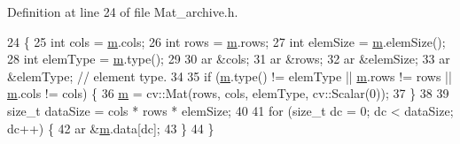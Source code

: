 Definition at line 24 of file Mat\+\_\+archive.\+h.


\begin{DoxyCode}
24                                                                          \{
25   \textcolor{keywordtype}{int} cols = \hyperlink{_gen_blob_8m_ab3cd915d758008bd19d0f2428fbb354a}{m}.cols;
26   \textcolor{keywordtype}{int} rows = \hyperlink{_gen_blob_8m_ab3cd915d758008bd19d0f2428fbb354a}{m}.rows;
27   \textcolor{keywordtype}{int} elemSize = \hyperlink{_gen_blob_8m_ab3cd915d758008bd19d0f2428fbb354a}{m}.elemSize();
28   \textcolor{keywordtype}{int} elemType = \hyperlink{_gen_blob_8m_ab3cd915d758008bd19d0f2428fbb354a}{m}.type();
29 
30   ar &cols;
31   ar &rows;
32   ar &elemSize;
33   ar &elemType; \textcolor{comment}{// element type.}
34 
35   \textcolor{keywordflow}{if} (\hyperlink{_gen_blob_8m_ab3cd915d758008bd19d0f2428fbb354a}{m}.type() != elemType || \hyperlink{_gen_blob_8m_ab3cd915d758008bd19d0f2428fbb354a}{m}.rows != rows || \hyperlink{_gen_blob_8m_ab3cd915d758008bd19d0f2428fbb354a}{m}.cols != cols) \{
36     \hyperlink{_gen_blob_8m_ab3cd915d758008bd19d0f2428fbb354a}{m} = cv::Mat(rows, cols, elemType, cv::Scalar(0));
37   \}
38 
39   \textcolor{keywordtype}{size\_t} dataSize = cols * rows * elemSize;
40 
41   \textcolor{keywordflow}{for} (\textcolor{keywordtype}{size\_t} dc = 0; dc < dataSize; dc++) \{
42     ar &\hyperlink{_gen_blob_8m_ab3cd915d758008bd19d0f2428fbb354a}{m}.data[dc];
43   \}
44 \}
\end{DoxyCode}
